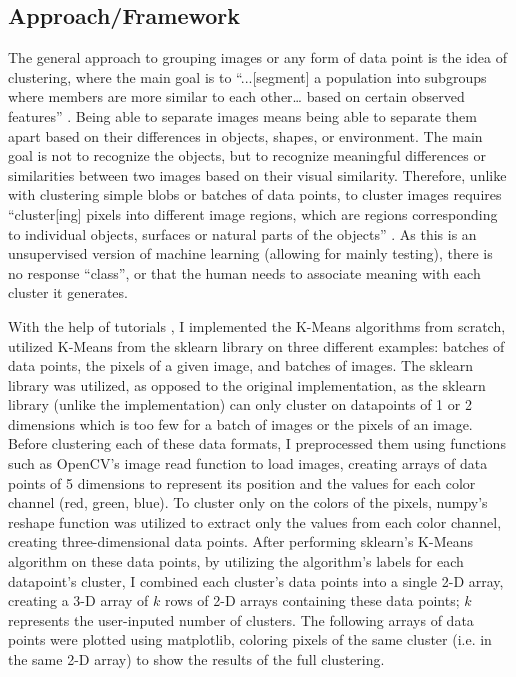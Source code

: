\documentclass[10pt,twocolumn]{article}
\begin{document}
\subsection {Approach/Framework}

The general approach to grouping images or any form of data point is the idea of clustering, where the main goal is to “...[segment] a population into subgroups where members are more similar to each other… based on certain observed features” \cite{C3Clustering}. Being able to separate images means being able to separate them apart based on their differences in objects, shapes, or environment. The main goal is not to recognize the objects, but to recognize meaningful differences or similarities between two images based on their visual similarity. Therefore, unlike with clustering simple blobs or batches of data points, to cluster images requires “cluster[ing] pixels into different image regions, which are regions corresponding to individual objects, surfaces or natural parts of the objects” \cite{Roy2014}. As this is an unsupervised version of machine learning (allowing for mainly testing), there is no response “class”, or that the human needs to associate meaning with each cluster it generates.

With the help of tutorials \cite{Khushijain2021, Jordan2018, Aktas2021}, I implemented the K-Means algorithms from scratch, utilized K-Means from the sklearn library on three different examples: batches of data points, the pixels of a given image, and batches of images. The sklearn library was utilized, as opposed to the original implementation, as the sklearn library (unlike the implementation) can only cluster on datapoints of 1 or 2 dimensions which is too few for a batch of images or the pixels of an image. Before clustering each of these data formats, I preprocessed them using functions such as OpenCV’s image read function to load images, creating arrays of data points of 5 dimensions to represent its position and the values for each color channel (red, green, blue). To cluster only on the colors of the pixels, numpy’s reshape function was utilized to extract only the values from each color channel, creating three-dimensional data points. After performing sklearn’s K-Means algorithm on these data points, by utilizing the algorithm’s labels for each datapoint’s cluster, I combined each cluster’s data points into a single 2-D array, creating a 3-D array of \(k\) rows of 2-D arrays containing these data points; \(k\) represents the user-inputed number of clusters. The following arrays of data points were plotted using matplotlib, coloring pixels of the same cluster (i.e. in the same 2-D array) to show the results of the full clustering. 
\end{document}
